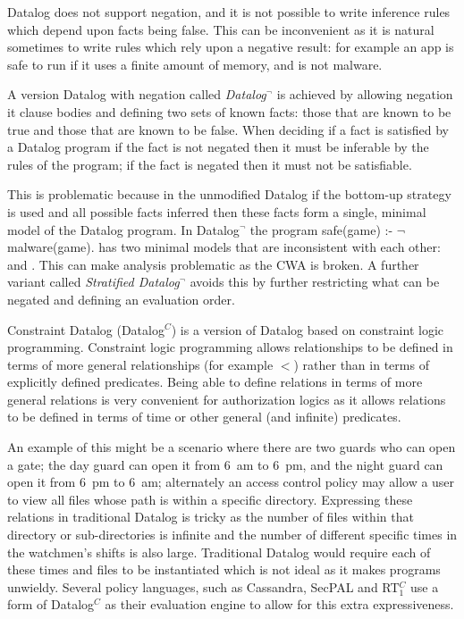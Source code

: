 \documentclass[a4paper,sfsidenotes]{tufte-book}
\begin{document}
Datalog does not support negation, and it is not possible to write inference
rules which depend upon facts being false.  This can be inconvenient as it is
natural sometimes to write rules which rely upon a negative result: for example
an app is safe to run if it uses a finite amount of memory, and is not malware.

A version Datalog with negation called \emph{Datalog$^\lnot$}\cite{Ceri:1989ff} is
achieved by allowing negation it clause bodies and defining two sets of known
facts: those that are known to be true and those that are known to be false.
When deciding if a fact is satisfied by a Datalog program if the fact is not
negated then it must be inferable by the rules of the program; if the fact is
negated then it must not be satisfiable.  

This is problematic because in the unmodified Datalog if the bottom-up strategy
is used and all possible facts inferred then these facts form a single, minimal
model of the Datalog program.  In Datalog$^\lnot$ the program \textsf{safe(game)
:- $\mathsf\lnot$ malware(game).} has two minimal models that are inconsistent
with each other:  and .  This can make
analysis problematic as the \ac{CWA} is broken. A further variant called
\emph{Stratified Datalog$^\lnot$} avoids this by further restricting what can be
negated and defining an evaluation order\cite{Apt:1986vj}.

Constraint Datalog (Datalog$^C$\cite{Li:2003ix}) is a version of Datalog based
on constraint logic programming.  Constraint logic programming allows
relationships to be defined in terms of more general relationships (for example
$<$) rather than in terms of explicitly defined predicates.  Being able to
define relations in terms of more general relations is very convenient for
authorization logics as it allows relations to be defined in terms of time or
other general (and infinite) predicates. 

An example of this might be a scenario where there are two guards who can open a
gate; the day guard can open it from 6~am to 6~pm, and the night guard can open
it from 6~pm to 6~am; alternately an access control policy may allow a user to
view all files whose path is within a specific directory.  Expressing these
relations in traditional Datalog is tricky as the number of files within that
directory or sub-directories is infinite and the number of different specific
times in the watchmen's shifts is also large.  Traditional Datalog would require
each of these times and files to be instantiated which is not ideal as it makes
programs unwieldy. Several policy languages, such as
Cassandra\cite{Becker:2004fi}, SecPAL\cite{Becker:2006vh} and
RT$_1^C$\cite{Li:2003ix} use a form of Datalog$^C$ as their evaluation engine to
allow for this extra expressiveness.
\end{document}
